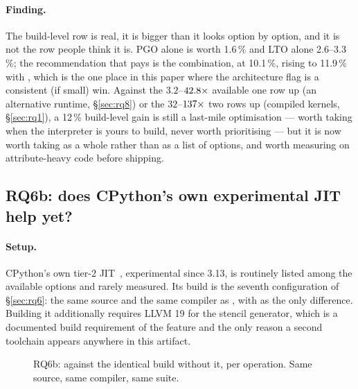 \paragraph{Finding.} The build-level row is real, it is bigger than it looks option by option,
and it is not the row people think it is. PGO alone is worth 1.6\,\% and LTO alone 2.6--3.3\,\%;
the recommendation that pays is the combination, at 10.1\,\%, rising to 11.9\,\% with
, which is the one place in this paper where the architecture flag is a
consistent (if small) win. Against the $3.2$--$\meas{ratio:b1_compute-314:matmul/cpython_loop|b1_compute-pypy311:matmul/cpython_loop}{42.8}\times$ available one row up (an alternative
runtime, \S\ref{sec:rq8}) or the $32$--$\meas{ratio:b1_compute-314:matmul/cpython_loop|b1_compute-314:matmul/numba_fastmath}{137}\times$ two rows up (compiled kernels,
\S\ref{sec:rq1}), a 12\,\% build-level gain is still a last-mile optimisation --- worth taking
when the interpreter is yours to build, never worth prioritising --- but it is now worth taking
as a whole rather than as a list of options, and worth measuring on attribute-heavy code before
shipping.

\subsection{RQ6b: does CPython's own experimental JIT help yet?}
\label{sec:rq6b}

\paragraph{Setup.} CPython's own tier-2 JIT~\cite{pep744}, experimental since 3.13, is
routinely listed among the available options and rarely measured. Its build is the seventh
configuration of \S\ref{sec:rq6}: the same source and the same compiler as , with
 as the only difference. Building it additionally requires LLVM
19 for the stencil generator, which is a documented build requirement of the feature and the
only reason a second toolchain appears anywhere in this artifact.

\begin{figure}[t]
  \centering
  \caption{RQ6b:  against the identical build without it, per
    operation. Same source, same compiler, same suite.}
  \label{fig:tier2}
\end{figure}

